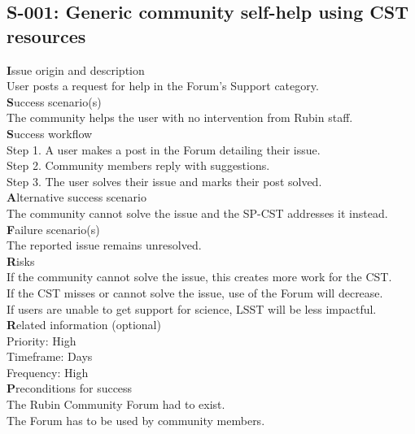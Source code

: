 \subsection{S-001: Generic community self-help using CST resources}

{\textbf Issue origin and description} \\
User posts a request for help in the Forum's Support category. \\

{\textbf Success scenario(s)} \\
The community helps the user with no intervention from Rubin staff. \\

{\textbf Success workflow} \\
Step 1. A user makes a post in the Forum detailing their issue.\\
Step 2. Community members reply with suggestions.\\
Step 3. The user solves their issue and marks their post solved.\\

{\textbf Alternative success scenario} \\
The community cannot solve the issue and the SP-CST addresses it instead. \\

{\textbf Failure scenario(s)} \\
The reported issue remains unresolved. \\

{\textbf Risks}\\
If the community cannot solve the issue, this creates more work for the CST. \\
If the CST misses or cannot solve the issue, use of the Forum will decrease. \\
If users are unable to get support for science, LSST will be less impactful. \\

{\textbf Related information (optional)} \\
Priority: High \\
Timeframe: Days \\
Frequency: High \\

{\textbf Preconditions for success}\\
The Rubin Community Forum had to exist. \\
The Forum has to be used by community members. \\
